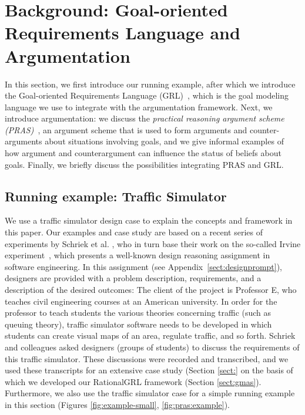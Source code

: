 \section{Background: Goal-oriented Requirements Language and Argumentation}
\label{sect:background}

In this section, we first introduce our running example, after which we introduce the Goal-oriented Requirements Language (GRL)~\cite{Amyot:2010:EGM:1841349.1841356}, which is the goal modeling language we use to integrate with the argumentation framework. Next, we introduce argumentation: we discuss the \emph{practical reasoning argument scheme (PRAS)}~\cite{atkinson2007}, an argument scheme that is used to form arguments and counter-arguments about situations involving goals, and we give informal examples of how argument and counterargument can influence the status of beliefs about goals. Finally, we briefly discuss the possibilities integrating PRAS and GRL.  %

\subsection{Running example: Traffic Simulator}
\label{sect:goals:runningexample}

We use a traffic simulator design case to explain the concepts and framework in this paper. Our examples and case study are based on a recent series of experiments by Schriek et al. \cite{SchriekEtal2016}, who in turn base their work on the so-called Irvine experiment~\cite{UCIworkshop}, which presents a well-known design reasoning assignment in software engineering. In this assignment (see Appendix~\ref{sect:designprompt}), designers are provided with a problem description, requirements, and a description of the desired outcomes: The client of the project is Professor E, who teaches civil engineering courses at an American university. In order for the professor to teach students the various theories concerning traffic (such as queuing theory), traffic simulator software needs to be developed in which students can create visual maps of an area, regulate traffic, and so forth. Schriek and colleagues asked designers (groups of students) to discuss the requirements of this traffic simulator. These discussions were recorded and transcribed, and we used these transcripts for an extensive case study (Section \ref{sect:} on the basis of which we developed our RationalGRL framework (Section \ref{sect:gmas}). Furthermore, we also use the traffic simulator case for a simple running example in this section (Figures \ref{fig:example-small}, \ref{fig:pras:example}). 

